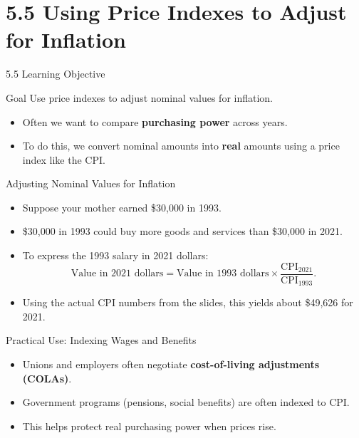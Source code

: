 \documentclass[aspectratio=169]{beamer}
\begin{document}
\section{5.5 Using Price Indexes to Adjust for Inflation}

\begin{frame}{5.5 Learning Objective}
\transfade
\begin{block}{Goal}
Use price indexes to adjust nominal values for inflation.
\end{block}
\begin{itemize}
  \item Often we want to compare \textbf{purchasing power} across years.
  \item To do this, we convert nominal amounts into \textbf{real} amounts using a price index like the CPI.
\end{itemize}
\end{frame}

\begin{frame}{Adjusting Nominal Values for Inflation}
\transfade
\begin{itemize}
  \item Suppose your mother earned \$30,000 in 1993.
  \item \$30,000 in 1993 could buy more goods and services than \$30,000 in 2021.
  \item To express the 1993 salary in 2021 dollars:
  \[
    \text{Value in 2021 dollars} =
    \text{Value in 1993 dollars} \times
    \frac{\text{CPI}_{2021}}{\text{CPI}_{1993}}.
  \]
  \item Using the actual CPI numbers from the slides, this yields about \$49,626 for 2021.
\end{itemize}
\end{frame}

\begin{frame}{Practical Use: Indexing Wages and Benefits}
\transfade
\begin{itemize}
  \item Unions and employers often negotiate \textbf{cost-of-living adjustments (COLAs)}.
  \item Government programs (pensions, social benefits) are often indexed to CPI.
  \item This helps protect real purchasing power when prices rise.
\end{itemize}
\end{frame}
\end{document}
